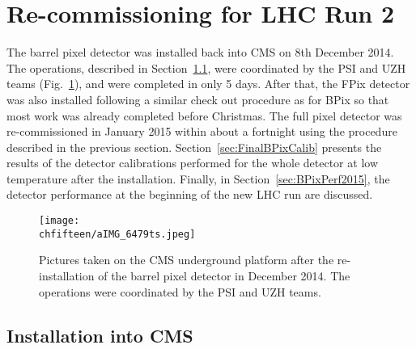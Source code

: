 \section{Re-commissioning for LHC Run 2}\label{sec:commissioning}

The barrel pixel detector was installed back into CMS on 8th December 2014.
The operations, described in Section~\ref{sec:BPixInst}, were coordinated by the PSI and UZH teams (Fig.~\ref{fig:BPixInst}), and were completed in only 5 days.
After that, the FPix detector was also installed following a similar check out procedure as for BPix so that most work was already completed before Christmas.
The full pixel detector was re-commissioned in January 2015 within about a fortnight using the procedure described in the previous section.
Section~\ref{sec:FinalBPixCalib} presents the results of the detector calibrations performed for the whole detector at low temperature after the installation.
Finally, in Section~\ref{sec:BPixPerf2015}, the detector performance at the beginning of the new LHC run are discussed.

\begin{figure}[!htb]
 \begin{center}
 \texttt{[image: \\chfifteen/aIMG\_6479ts.jpeg]}
 \end{center}
 \caption{Pictures taken on the CMS underground platform after the re-installation of the barrel pixel detector in December 2014. The operations were coordinated by the PSI and UZH teams.}
 \label{fig:BPixInst}
\end{figure}

\subsection{Installation into CMS}\label{sec:BPixInst}

